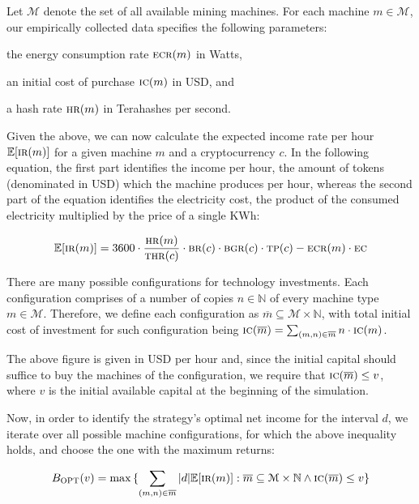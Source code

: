 
Let $\mathcal{M}$ denote the set of
all available mining machines. For each machine $m \in \mathcal{M}$, our empirically
collected data specifies the following parameters:
\begin{inparaenum}[i)]
    \item the energy consumption rate $\textsc{ecr}(m)$ in Watts,
    \item an initial cost of purchase $\textsc{ic}(m)$ in USD, and
    \item a hash rate $\textsc{hr}(m)$ in Terahashes per second.
\end{inparaenum}
Given the above, we can now calculate the expected income rate per hour
$\mathbb{E}[\textsc{ir}(m)]$ for a given machine $m$ and a cryptocurrency $c$. In the
following equation, the first part identifies the income per hour, \ie the
amount of tokens (denominated in USD) which the machine produces per hour,
whereas the second part of the equation identifies the electricity cost, \ie
the product of the consumed electricity multiplied by the price of a single
KWh:

\[
\mathbb{E}[\textsc{ir}(m)] = 3600 \cdot \frac{\textsc{hr}(m)}{\textsc{thr}(c)} \cdot \textsc{br}(c) \cdot \textsc{bgr}(c) \cdot \textsc{tp}(c) - \textsc{ecr}(m) \cdot \textsc{ec}
\]

There are many possible configurations for technology investments. Each
configuration comprises of a number of copies $n \in \mathbb{N}$ of every
machine type $m \in \mathcal{M}$. Therefore, we define each configuration as
$\overline{m} \subseteq \mathcal{M} \times \mathbb{N}$, with
total initial cost of investment for such configuration being
$\textsc{ic}(\overline{m}) = \sum_{(m, n) \in \overline{m}}{n \cdot \textsc{ic}(m)}$.

The above figure is given in USD per hour and, since the initial capital should
suffice to buy the machines of the configuration, we require that
$\textsc{ic}(\overline{m}) \leq v$,
where $v$ is the initial available capital at the beginning of the simulation.

Now, in order to identify the strategy's optimal net income for the
interval $d$, we iterate over all possible machine configurations, for which
the above inequality holds, and choose the one with the maximum returns:

\[
  B_\textsc{OPT}(v)
  =
  \max{
    \{
      \sum_{(m, n) \in \overline{m}}
      {|d|\mathbb{E}[\textsc{ir}(m)]}:
      \overline{m} \subseteq \mathcal{M} \times \mathbb{N}
      \land
      \textsc{ic}(\overline{m}) \leq v
    \}
  }
\]


